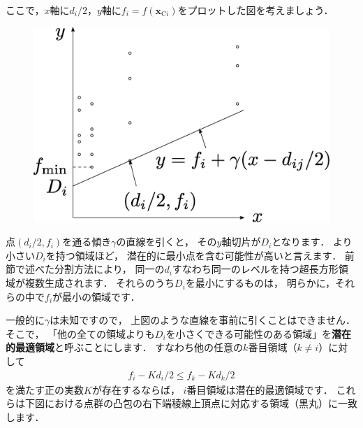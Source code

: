 ﻿\documentclass{jsarticle}
\begin{document}
ここで，$x$軸に$d_{i}/2$，$y$軸に$f_{i}=f(\bm{x}_{\mathrm{C}i})$をプロットした図を考えましょう．

\begin{figure}[h]
\begin{center}
\includegraphics[height=.25\textheight]{fig/DIRECT_lowerbound_estimate.eps}
\end{center}
\end{figure}

点$(d_{i}/2,f_{i})$を通る傾き$\gamma$の直線を引くと，
その$y$軸切片が$D_{i}$となります．
より小さい$D_{i}$を持つ領域ほど，
潜在的に最小点を含む可能性が高いと言えます．
前節で述べた分割方法により，
同一の$d_{i}$すなわち同一のレベルを持つ超長方形領域が複数生成されます．
それらのうち$D_{i}$を最小にするものは，
明らかに，それらの中で$f_{i}$が最小の領域です．

一般的に$\gamma$は未知ですので，
上図のような直線を事前に引くことはできません．
そこで，
「他の全ての領域よりも$D_{i}$を小さくできる可能性のある領域」を{\bf 潜在的最適領域}と呼ぶことにします．
すなわち他の任意の$k$番目領域（$k\neq i$）に対して
\begin{align*}
f_{i}-K d_{i}/2 \leq f_{k}-K d_{k}/2
\end{align*}
を満たす正の実数$K$が存在するならば，
$i$番目領域は潜在的最適領域です．
これらは下図における点群の凸包の右下端稜線上頂点に対応する領域（黒丸）に一致します．
\end{document}
